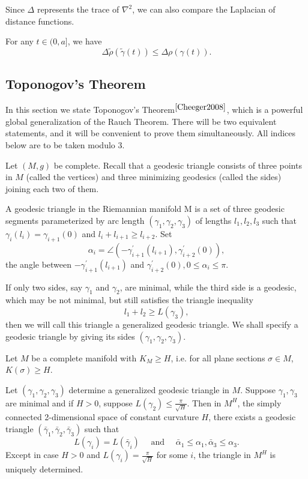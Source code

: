 \documentclass{ctexart}
\begin{document}
Since $\Delta$ represents the trace of $\nabla^2$, we can also compare the Laplacian of distance functions.
\begin{corollary}
  For any $t \in (0, a]$, we have 
  $$
  \Delta \widetilde{\rho}(\widetilde{\gamma}(t)) \leq \Delta \rho(\gamma(t)).
  $$
\end{corollary}

\subsection*{Toponogov's Theorem}

In this section we state Toponogov's Theorem$^{\cite{Cheeger2008}}$, which is a powerful global generalization of the Rauch Theorem. There will be two equivalent statements, and it will be convenient to prove them simultaneously.
All indices below are to be taken modulo 3. 

Let $(M, g)$ be complete. Recall that a geodesic triangle consists of three points in $M$ (called the vertices) and three minimizing geodesics (called the sides) joining each two of them. 
\begin{definition}
  A geodesic triangle in the Riemannian manifold $\mathrm{M}$ is a set of three geodesic segments parameterized by arc length $\left(\gamma_1, \gamma_2, \gamma_3\right)$ of lengths $l_1, l_2, l_3$ such that 
  $\gamma_i\left(l_i\right)=\gamma_{i+1}(0)$ and $l_i+l_{i+1} \geq l_{i+2}$. Set
  $$
  \alpha_i=\angle\left(-\gamma_{i+1}^{\prime}\left(l_{i+1}\right), \gamma_{i+2}^{\prime}(0)\right),
  $$
  the angle between $-\gamma_{i+1}^{\prime}\left(l_{i+1}\right)$ and $\gamma_{i+2}^{\prime}(0), 0 \leq \alpha_i \leq \pi$.  
\end{definition}
If only two sides, say $\gamma_1$ and $\gamma_2$, are minimal, while the third side is a geodesic, which may be not minimal, but still satisfies the triangle inequality
$$
l_1+l_2 \geq L\left(\gamma_{3}\right), 
$$
then we will call this triangle a generalized geodesic triangle. We shall specify a geodesic triangle by giving its sides $\left(\gamma_1, \gamma_2, \gamma_3\right)$.

Let $M$ be a complete manifold with $K_M \geq H$, i.e. for all plane sections $\sigma\in M$, $K(\sigma)\geq H$.
\begin{theorem}
  Let $\left(\gamma_1, \gamma_2, \gamma_3\right)$ determine a generalized geodesic triangle in $M$. Suppose $\gamma_1, \gamma_3$ are minimal and if $H>0$, suppose $L\left(\gamma_2\right) \leq \frac{\pi}{\sqrt{H}}$. 
  Then in $M^H$, the simply connected 2-dimensional space of constant curvature $H$, there exists a geodesic triangle $\left(\bar{\gamma}_1, \bar{\gamma}_2, \bar{\gamma}_3\right)$ 
  such that 
  $$
  L\left(\gamma_i\right)=L\left(\bar{\gamma}_i\right) \quad \text{ and } \quad \bar{\alpha}_1 \leq \alpha_1, \bar{\alpha}_3 \leq \alpha_3.
  $$
  Except in case $H>0$ and $L\left(\gamma_i\right)=\frac{\pi}{\sqrt{H}}$ for some $i$, the triangle in $M^H$ is uniquely determined.
\end{theorem}
\end{document}
